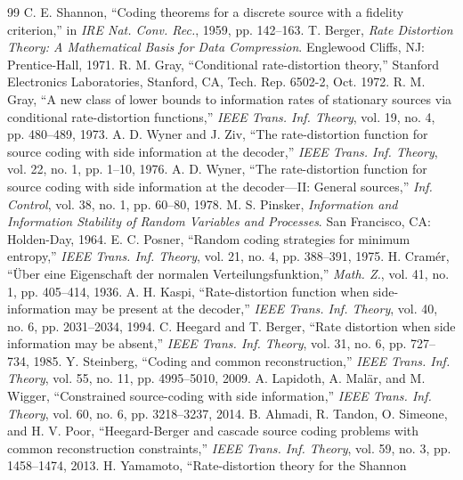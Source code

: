﻿\documentclass[11pt,onecolumn]{IEEEtran}
\begin{document}
\begin{thebibliography}{99}
 C. E. Shannon, ``Coding theorems for a discrete source
with a fidelity criterion,'' in \emph{IRE Nat. Conv. Rec.}, 1959, pp. 142--163.
 T. Berger, \emph{Rate Distortion Theory: A Mathematical
Basis for Data Compression}. Englewood Cliffs, NJ: Prentice-Hall, 1971.
 R. M. Gray, ``Conditional rate-distortion theory,''
Stanford Electronics Laboratories, Stanford, CA, Tech. Rep. 6502-2, Oct. 1972.
 R. M. Gray, ``A new class of lower bounds to information
rates of stationary sources via conditional rate-distortion functions,''
\emph{IEEE Trans. Inf. Theory}, vol. 19, no. 4, pp. 480--489, 1973.
 A. D. Wyner and J. Ziv, ``The rate-distortion function
for source coding with side information at the decoder,'' \emph{IEEE Trans.
Inf. Theory}, vol. 22, no. 1, pp. 1--10, 1976.
 A. D. Wyner, ``The rate-distortion function for source
coding with side information at the decoder---II: General sources,''
\emph{Inf. Control}, vol. 38, no. 1, pp. 60--80, 1978.
 M. S. Pinsker, \emph{Information and Information
Stability of Random Variables and Processes}. San Francisco, CA:
Holden-Day, 1964.
 E. C. Posner, ``Random coding strategies for minimum
entropy,'' \emph{IEEE Trans. Inf. Theory}, vol. 21, no. 4, pp. 388--391,
1975.
 H. Cram\'er, ``\"Uber eine Eigenschaft der normalen
Verteilungsfunktion,'' \emph{Math. Z.}, vol. 41, no. 1, pp. 405--414,
1936.
 A. H. Kaspi, ``Rate-distortion function when
side-information may be present at the decoder,'' \emph{IEEE Trans. Inf.
Theory}, vol. 40, no. 6, pp. 2031--2034, 1994.
 C. Heegard and T. Berger, ``Rate distortion when
side information may be absent,'' \emph{IEEE Trans. Inf. Theory}, vol. 31,
no. 6, pp. 727--734, 1985.
 Y. Steinberg, ``Coding and common reconstruction,''
\emph{IEEE Trans. Inf. Theory}, vol. 55, no. 11, pp. 4995--5010, 2009.
 A. Lapidoth, A. Mal\"ar, and M. Wigger, ``Constrained
source-coding with side information,'' \emph{IEEE Trans. Inf. Theory},
vol. 60, no. 6, pp. 3218--3237, 2014.
 B. Ahmadi, R. Tandon, O. Simeone, and H. V. Poor,
``Heegard-Berger and cascade source coding problems with common reconstruction
constraints,'' \emph{IEEE Trans. Inf. Theory}, vol. 59, no. 3,
pp. 1458--1474, 2013.
 H. Yamamoto, ``Rate-distortion theory for the Shannon

\end{thebibliography}
\end{document}
